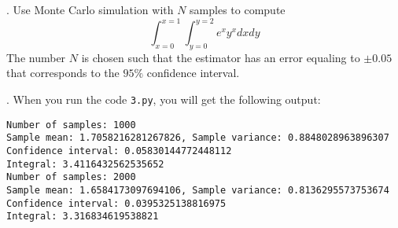 \documentclass[a4paper,notitlepage,cs4size,cap,indent,oneside,12pt]{article}
\numberwithin{equation}{section}
\numberwithin{figure}{section}
\newcommand{\blue}{\color{blue}}
\begin{document}
. Use Monte Carlo simulation with $N$ samples to compute
\begin{equation*}
  \int_{x=0}^{x=1}\int_{y=0}^{y=2} e^x y^x dx dy
\end{equation*}
The number $N$ is chosen such that the estimator has an error equaling to $\pm0.05$ that corresponds to the $95\%$ confidence interval.

{\blue

. When you run the code \texttt{3.py}, you will get the following output:
\begin{verbatim}
Number of samples: 1000
Sample mean: 1.7058216281267826, Sample variance: 0.8848028963896307
Confidence interval: 0.05830144772448112
Integral: 3.4116432562535652
Number of samples: 2000
Sample mean: 1.6584173097694106, Sample variance: 0.8136295573753674
Confidence interval: 0.0395325138816975
Integral: 3.316834619538821

\end{verbatim}
}
\end{document}

